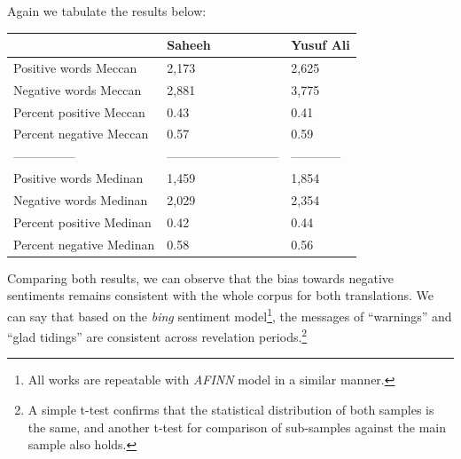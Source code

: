 \documentclass[
]{article}
\newenvironment{Shaded}{\begin{snugshade}}{\end{snugshade}}
\newcommand{\FunctionTok}[1]{\textcolor[rgb]{0.13,0.29,0.53}{\textbf{#1}}}
\newcommand{\NormalTok}[1]{#1}
\newcommand{\OtherTok}[1]{\textcolor[rgb]{0.56,0.35,0.01}{#1}}
\newcommand{\SpecialCharTok}[1]{\textcolor[rgb]{0.81,0.36,0.00}{\textbf{#1}}}
\newcommand{\StringTok}[1]{\textcolor[rgb]{0.31,0.60,0.02}{#1}}
\begin{document}
\begin{Shaded}
\end{Shaded}

\normalsize

Again we tabulate the results below:

\begin{longtable}[]{@{}lll@{}}
\toprule\noalign{}
& Saheeh & Yusuf Ali \\
\midrule\noalign{}
\endhead
\bottomrule\noalign{}
\endlastfoot
Positive words Meccan & 2,173 & 2,625 \\
Negative words Meccan & 2,881 & 3,775 \\
Percent positive Meccan & 0.43 & 0.41 \\
Percent negative Meccan & 0.57 & 0.59 \\
--------------- & --------------------------- & ------------ \\
Positive words Medinan & 1,459 & 1,854 \\
Negative words Medinan & 2,029 & 2,354 \\
Percent positive Medinan & 0.42 & 0.44 \\
Percent negative Medinan & 0.58 & 0.56 \\
\end{longtable}

Comparing both results, we can observe that the bias towards negative sentiments remains consistent with the whole corpus for both translations. We can say that based on the \emph{bing} sentiment model\footnote{All works are repeatable with \emph{AFINN} model in a similar manner.}, the messages of ``warnings'' and ``glad tidings'' are consistent across revelation periods.\footnote{A simple t-test confirms that the statistical distribution of both samples is the same, and another t-test for comparison of sub-samples against the main sample also holds.}
\end{document}
